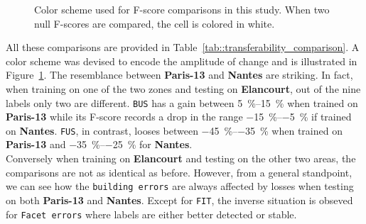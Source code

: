             \begin{figure}[htb]
                \centering
                
                \caption[
                    Color scheme used for F-score comparisons in this study.
                ]{
                    \label{fig::comparison_bar}
                    Color scheme used for F-score comparisons in this study.
                    When two null F-scores are compared, the cell is colored in white.
                }
            \end{figure}

            All these comparisons are provided in Table~\ref{tab::transferability_comparison}.
            A color scheme was devised to encode the amplitude of change and is illustrated in Figure~\ref{fig::comparison_bar}.
            The resemblance between \textbf{Paris-13} and \textbf{Nantes} are striking.
            In fact, when training on one of the two zones and testing on \textbf{Elancourt}, out of the nine labels only two are different.
            \texttt{BUS} has a gain between \SIrange[range-phrase={ and }]{5}{15}{\percent} when trained on \textbf{Paris-13} while its F-score records a drop in the range \SIrange{-15}{-5}{\percent} if trained on \textbf{Nantes}.
            \texttt{FUS}, in contrast, looses between \SIrange[range-phrase={ and }]{-45}{-35}{\percent} when trained on \textbf{Paris-13} and \SIrange[range-phrase={ and }]{-35}{-25}{\percent} for \textbf{Nantes}.\\
            Conversely when training on \textbf{Elancourt} and testing on the other two areas, the comparisons are not as identical as before.
            However, from a general standpoint, we can see how the \texttt{building errors} are always affected by losses when testing on both \textbf{Paris-13} and \textbf{Nantes}.
            Except for \texttt{FIT}, the inverse situation is obseved for \texttt{Facet errors} where labels are either better detected or stable.

